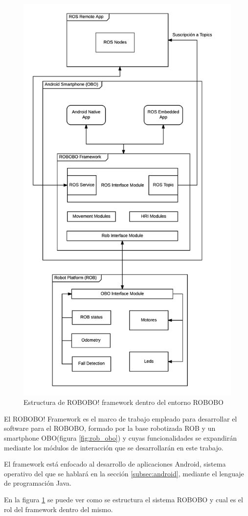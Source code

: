 \begin{figure}
	\centering
	\includegraphics[width=0.7\linewidth]{imagenes/robobo_framework_2.png}
	\caption{Estructura de ROBOBO! framework dentro del entorno ROBOBO}
	\label{fig:robobo_framework_estructure}
\end{figure}




El ROBOBO! Framework es el marco de trabajo empleado para desarrollar el software para el ROBOBO, formado por la base robotizada ROB y un smartphone OBO(figura \ref{fig:rob_obo}) y cuyas funcionalidades se expandirán mediante los módulos de interacción que se desarrollarán en este trabajo. 

El framework está enfocado al desarrollo de aplicaciones Android, sistema operativo del que se hablará en la sección \ref{subsec:android}, mediante el lenguaje de programación Java.
 
En la figura \ref{fig:robobo_framework_estructure} se puede ver como se estructura el sistema ROBOBO y cual es el rol del framework dentro del mismo.

